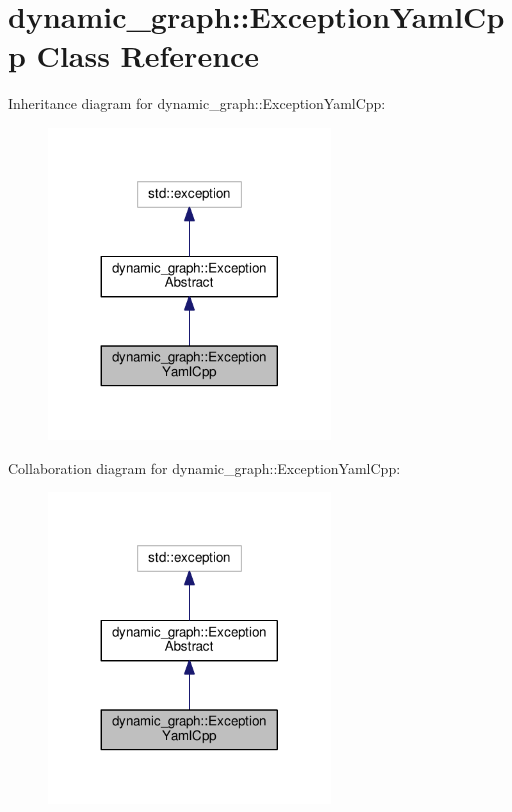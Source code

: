 \hypertarget{classdynamic__graph_1_1ExceptionYamlCpp}{}\section{dynamic\+\_\+graph\+:\+:Exception\+Yaml\+Cpp Class Reference}
\label{classdynamic__graph_1_1ExceptionYamlCpp}


Inheritance diagram for dynamic\+\_\+graph\+:\+:Exception\+Yaml\+Cpp\+:
\nopagebreak
\begin{figure}[H]
\begin{center}
\leavevmode
\includegraphics[width=212pt]{classdynamic__graph_1_1ExceptionYamlCpp__inherit__graph}
\end{center}
\end{figure}


Collaboration diagram for dynamic\+\_\+graph\+:\+:Exception\+Yaml\+Cpp\+:
\nopagebreak
\begin{figure}[H]
\begin{center}
\leavevmode
\includegraphics[width=212pt]{classdynamic__graph_1_1ExceptionYamlCpp__coll__graph}
\end{center}
\end{figure}
